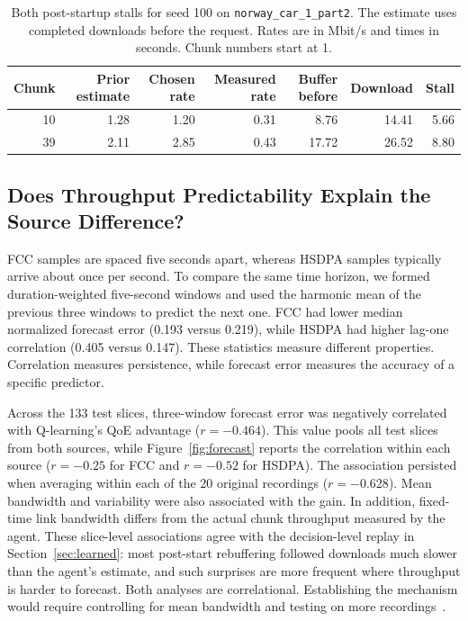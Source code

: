 \documentclass[10pt,letterpaper]{article}
\newif\ifreview
\newcommand{\reviewcolor}{\ifreview\color{reviewred}\fi}
\newenvironment{reviewedit}{\reviewcolor}{}
\begin{document}
\begin{reviewedit}
\begin{table}[htbp]
\reviewcolor
\centering\small
\caption{Both post-startup stalls for seed 100 on \texttt{norway\_car\_1\_part2}.
The estimate uses completed downloads before the request. Rates are in Mbit/s
and times in seconds. Chunk numbers start at 1.}
\label{tab:replay}
\begin{tabular}{rrrrrrr}
\toprule
Chunk & Prior estimate & Chosen rate & Measured rate & Buffer before & Download & Stall \\
\midrule
10 & 1.28 & 1.20 & 0.31 & 8.76 & 14.41 & 5.66 \\
39 & 2.11 & 2.85 & 0.43 & 17.72 & 26.52 & 8.80 \\
\bottomrule
\end{tabular}
\end{table}
\end{reviewedit}

\subsection{Does Throughput Predictability Explain the Source Difference?}

FCC samples are spaced five seconds apart, whereas HSDPA samples typically
arrive about once per second. To compare the same time horizon, we formed
duration-weighted five-second windows and used the harmonic mean of the
previous three windows to predict the next one. FCC had lower median
normalized forecast error (0.193 versus 0.219), while HSDPA had higher
lag-one correlation (0.405 versus 0.147). These statistics measure different
properties. Correlation measures persistence, while forecast error measures
the accuracy of a specific predictor.

Across the 133 test slices, three-window forecast error was negatively
correlated with Q-learning's QoE advantage (\(r=-0.464\)). This value pools
all test slices from both sources, while Figure~\ref{fig:forecast} reports
the correlation within each source (\(r=-0.25\) for FCC and \(r=-0.52\) for
HSDPA). The association
persisted when averaging within each of the 20 original recordings
(\(r=-0.628\)). Mean bandwidth and variability were also associated with the
gain. In addition, fixed-time link bandwidth differs from the actual chunk
throughput measured by the agent. These slice-level associations agree with the
decision-level replay in Section~\ref{sec:learned}: most post-start
rebuffering followed downloads much slower than the agent's estimate, and
such surprises are more frequent where throughput is harder to forecast. Both
analyses are correlational. Establishing the mechanism would require
controlling for mean bandwidth and testing on more recordings~\cite{dynamics}.
\end{document}
